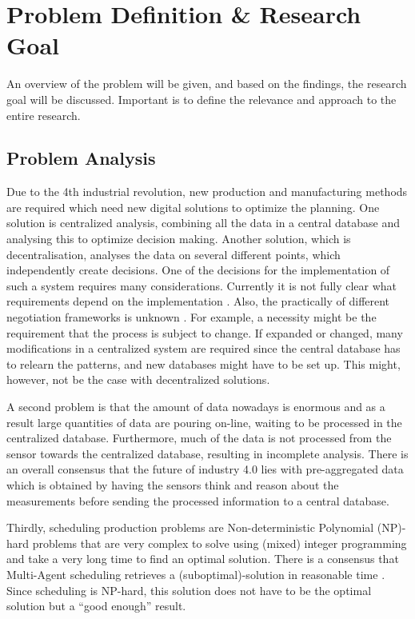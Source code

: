\chapter{Problem Definition \& Research Goal}
\label{chp:problem}
An overview of the problem will be given, and based on the findings, the research goal will be discussed. Important is to define the relevance and approach to the entire research. 
\section{Problem Analysis}
Due to the 4th industrial revolution, new production and manufacturing methods are required which need new digital solutions to optimize the planning. One solution is centralized analysis, combining all the data in a central database and analysing this to optimize decision making. Another solution, which is decentralisation, analyses the data on several different points, which independently create decisions. One of the decisions for the implementation of such a system requires many considerations. Currently it is not fully clear what requirements depend on the implementation \citep{leitao2016smart}. Also, the practically of different negotiation frameworks is unknown \citep{fatima2014principles}. For example, a necessity might be the requirement that the process is subject to change. If expanded or changed, many modifications in a centralized system are required since the central database has to relearn the patterns, and new databases might have to be set up. This might, however, not be the case with decentralized solutions. %

A second problem is that the amount of data nowadays is enormous and as a result large quantities of data are pouring on-line, waiting to be processed in the centralized database. Furthermore, much of the data is not processed from the sensor towards the centralized database, resulting in incomplete analysis. There is an overall consensus that the future of industry 4.0 lies with pre-aggregated data \citep{deloitte2015connected} which is obtained by having the sensors think and reason about the measurements before sending the processed information to a central database.

Thirdly, scheduling production problems are Non-deterministic Polynomial (NP)-hard problems that are very complex to solve using (mixed) integer programming and take a very long time to find an optimal solution. There is a consensus that Multi-Agent scheduling retrieves a (suboptimal)-solution in reasonable time \citep{konolige1980multiple}. Since scheduling is NP-hard, this solution does not have to be the optimal solution but a ``good enough'' result.  

